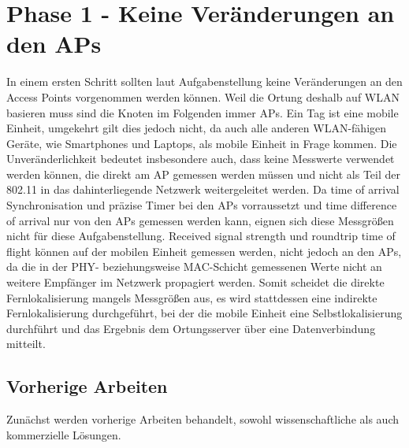 \chapter{Phase 1 - Keine Veränderungen an den APs}
\label{ch:phase1}
In einem ersten Schritt sollten laut Aufgabenstellung keine Veränderungen an den Access Points vorgenommen werden können.
Weil die Ortung deshalb auf WLAN basieren muss sind die Knoten im Folgenden immer APs. 
Ein Tag ist eine mobile Einheit, umgekehrt gilt dies jedoch nicht, da auch alle anderen WLAN-fähigen Geräte, wie Smartphones und Laptops, als mobile Einheit in Frage kommen.
Die Unveränderlichkeit bedeutet insbesondere auch, dass keine Messwerte verwendet werden können, die direkt am AP gemessen werden müssen und nicht als Teil der 802.11 in das dahinterliegende Netzwerk weitergeleitet werden.
Da time of arrival Synchronisation und präzise Timer bei den APs vorraussetzt und time difference of arrival nur von den APs gemessen werden kann, eignen sich diese Messgrößen nicht für diese Aufgabenstellung.
Received signal strength und roundtrip time of flight können auf der mobilen Einheit gemessen werden, nicht jedoch an den APs, da die in der PHY- beziehungsweise MAC-Schicht gemessenen Werte nicht an weitere Empfänger im Netzwerk propagiert werden. 
Somit scheidet die direkte Fernlokalisierung mangels Messgrößen aus, es wird stattdessen eine indirekte Fernlokalisierung durchgeführt, bei der die mobile Einheit eine Selbstlokalisierung durchführt und das Ergebnis dem Ortungsserver über eine Datenverbindung mitteilt.


\section{Vorherige Arbeiten}
\label{ch:phase1:sec:vorherige}
Zunächst werden vorherige Arbeiten behandelt, sowohl wissenschaftliche als auch kommerzielle Lösungen.


